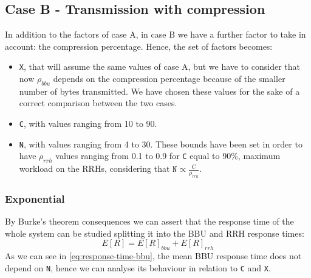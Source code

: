 \documentclass[11pt,a4paper,oneside, openright]{article}
\begin{document}
\subsection{Case B - Transmission with compression}
In addition to the factors of case A, in case B we have a further factor to take in account: the compression percentage. Hence, the set of factors becomes:

\begin{itemize}
	\item \texttt{X}, that will assume the same values of case A, but we have to consider that now $ \rho_{bbu} $ depends on the compression percentage because of the smaller number of bytes transmitted. We have chosen these values for the sake of a correct comparison between the two cases.
	\item \texttt{C}, with values ranging from 10 to 90. 
	\item \texttt{N}, with values ranging from 4 to 30. These bounds have been set in order to have $\rho_{rrh}$ values ranging from 0.1 to 0.9 for \texttt{C} equal to 90\%, maximum workload on the RRHs, considering that $\texttt{N} \propto \frac{C}{\rho_{rrh}}$.	
\end{itemize}


\subsubsection{Exponential}
By Burke's theorem consequences we can assert that the response time of the whole system can be studied splitting it into the BBU and RRH response times:
\begin{equation}
E[R] = E[R]_{bbu} + E[R]_{rrh}
\end{equation} 
As we can see in \ref{eq:response-time-bbu}, the mean BBU response time does not depend on \texttt{N}, hence we can analyse its behaviour in relation to \texttt{C} and \texttt{X}.
\end{document}
